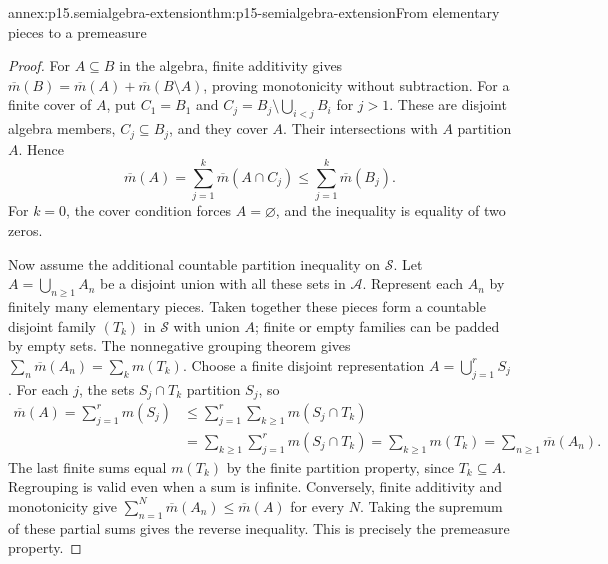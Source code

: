 \begin{annexitem}{annex:p15.semialgebra-extension}{thm:p15-semialgebra-extension}{From elementary pieces to a premeasure}
\begin{proof}
For \(A\subseteq B\) in the algebra, finite additivity gives
\(\overline m(B)=\overline m(A)+\overline m(B\setminus A)\),
proving monotonicity without subtraction. For a finite cover of \(A\),
put \(C_1=B_1\) and
\(C_j=B_j\setminus\bigcup_{i<j}B_i\) for \(j>1\). These are
disjoint algebra members, \(C_j\subseteq B_j\), and they cover
\(A\). Their intersections with \(A\) partition \(A\). Hence
\[
 \overline m(A)=\sum_{j=1}^k\overline m(A\cap C_j)
       \leq\sum_{j=1}^k\overline m(B_j).
\]
For \(k=0\), the cover condition forces \(A=\varnothing\), and
the inequality is equality of two zeros.

Now assume the additional countable partition inequality on \(\mathcal S\).
Let \(A=\bigcup_{n\geq1}A_n\) be a disjoint union with all these
sets in \(\mathcal A\). Represent each \(A_n\) by finitely many
elementary pieces. Taken together these pieces form a countable disjoint
family \((T_k)\) in \(\mathcal S\) with union \(A\); finite or
empty families can be padded by empty sets. The nonnegative grouping
theorem gives
\(\sum_n\overline m(A_n)=\sum_k m(T_k)\).
Choose a finite disjoint representation \(A=\bigcup_{j=1}^r S_j\).
For each \(j\), the sets \(S_j\cap T_k\) partition \(S_j\), so
\[
 \begin{aligned}
 \overline m(A)=\sum_{j=1}^r m(S_j)
  &\leq\sum_{j=1}^r\sum_{k\geq1}m(S_j\cap T_k)\\
  &=\sum_{k\geq1}\sum_{j=1}^r m(S_j\cap T_k)
   =\sum_{k\geq1}m(T_k)=\sum_{n\geq1}\overline m(A_n).
 \end{aligned}
\]
The last finite sums equal \(m(T_k)\) by the finite partition property,
since \(T_k\subseteq A\). Regrouping is valid even when a sum is
infinite. Conversely, finite additivity and monotonicity give
\(\sum_{n=1}^N\overline m(A_n)\leq\overline m(A)\) for every
\(N\). Taking the supremum of these partial sums gives the reverse
inequality. This is precisely the premeasure property.
\end{proof}
\end{annexitem}

